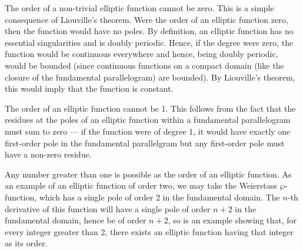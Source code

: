 \documentclass[12pt]{article}
\begin{document}
The order of a non-trivial elliptic function cannot be zero.  This is a 
simple consequence of Liouville's theorem.  Were the order of an elliptic
function zero, then the function would have no poles.  By definition,
an elliptic function has no essential singularities and is doubly
periodic.  Hence, if the degree were zero, the function would be
continuous everywhere and hence, being doubly periodic, would be
bounded (since continuous functions on a compact domain (like the
closure of the fundamental parallelogram) are bounded).  By Liouville's
theorem, this would imply that the function is constant.

The order of an elliptic function cannot be 1.  This follows from the
fact that the residues at the poles of an elliptic function within a
fundamental parallelogram must sum to zero --- if the function were of
degree 1, it would have exactly one first-order pole in the
fundamental parallelgram but any first-order pole must have a non-zero
residue.

Any number greater than one is possible as the order of an elliptic
function.  As an example of an elliptic function of order two, we may
take the Weierstass $\wp$-function, which has a single pole of order 2
in the fundamental domain.  The $n$-th derivative of this function
will have a single pole of order $n+2$ in the fundamental domain,
hence be of order $n+2$, so is an example showing that, for every
integer greater than 2, there exists an elliptic function having that
integer as its order.
\end{document}
